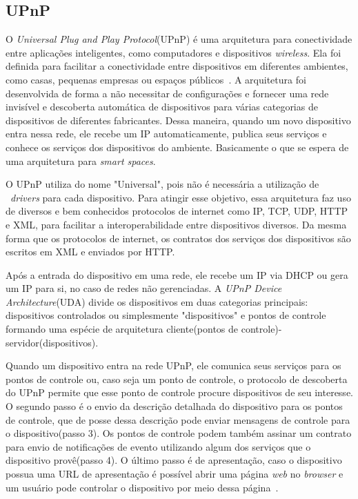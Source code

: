 \subsection{UPnP}
O \emph{Universal Plug and Play Protocol}(UPnP) é uma arquitetura para conectividade entre aplicações inteligentes, como computadores e dispositivos \emph{wireless}. Ela foi definida para facilitar a conectividade entre dispositivos em diferentes ambientes, como casas, pequenas empresas ou espaços públicos~\cite{upnpArch}. A arquitetura foi desenvolvida de forma a não necessitar de configurações e fornecer uma rede invisível e descoberta automática de dispositivos para várias categorias de dispositivos de diferentes fabricantes. Dessa maneira, quando um novo dispositivo entra nessa rede, ele recebe um IP automaticamente, publica seus serviços e conhece os serviços dos dispositivos do ambiente. Basicamente o que se espera de uma arquitetura para \emph{smart spaces}. 

O UPnP utiliza do nome "Universal", pois não é necessária a utilização de ~\emph{drivers} para cada dispositivo. Para atingir esse objetivo, essa arquitetura faz uso de diversos e bem conhecidos protocolos de internet como IP, TCP, UDP, HTTP e XML, para facilitar a interoperabilidade entre dispositivos diversos. Da mesma forma que os protocolos de internet, os contratos dos serviços dos dispositivos são escritos em XML e enviados por HTTP.

Após a entrada do dispositivo em uma rede, ele recebe um IP via DHCP ou gera um IP para si, no caso de redes não gerenciadas. A \emph{UPnP Device Architecture}(UDA) divide os dispositivos em duas categorias principais: dispositivos controlados ou simplesmente "dispositivos" e pontos de controle~\cite{upnpArch} formando uma espécie de arquitetura cliente(pontos de controle)-servidor(dispositivos). 

Quando um dispositivo entra na rede UPnP, ele comunica seus serviços para os pontos de controle ou, caso seja um ponto de controle, o protocolo de descoberta do UPnP permite que esse ponto de controle procure dispositivos de seu interesse. O segundo passo é o envio da descrição detalhada do dispositivo para os pontos de controle, que de posse dessa descrição pode enviar mensagens de controle para o dispositivo(passo 3). Os pontos de controle podem também assinar um contrato para envio de notificações de evento utilizando algum dos serviços que o dispositivo provê(passo 4). O último passo é de apresentação, caso o dispositivo possua uma URL de apresentação é possível abrir uma página \emph{web} no \emph{browser} e um usuário pode controlar o dispositivo por meio dessa página~\cite{upnpArch}.

